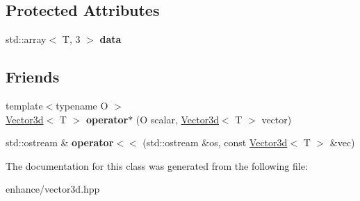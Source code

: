 \subsection*{Protected Attributes}
\begin{DoxyCompactItemize}
\item 
\mbox{\label{classenhance_1_1Vector3d_a6e216e575ab780dfae8a65a945ec286e}} 
std\+::array$<$ T, 3 $>$ {\bfseries data}
\end{DoxyCompactItemize}
\subsection*{Friends}
\begin{DoxyCompactItemize}
\item 
\mbox{\label{classenhance_1_1Vector3d_a6f5e8062a1500764d2b38787f1471b65}} 
{\footnotesize template$<$typename O $>$ }\\\mbox{\hyperlink{classenhance_1_1Vector3d}{Vector3d}}$<$ T $>$ {\bfseries operator$\ast$} (O scalar, \mbox{\hyperlink{classenhance_1_1Vector3d}{Vector3d}}$<$ T $>$ vector)
\item 
\mbox{\label{classenhance_1_1Vector3d_afbaa27f45fba698f24a7643be7df5dbf}} 
std\+::ostream \& {\bfseries operator$<$$<$} (std\+::ostream \&os, const \mbox{\hyperlink{classenhance_1_1Vector3d}{Vector3d}}$<$ T $>$ \&vec)
\end{DoxyCompactItemize}


The documentation for this class was generated from the following file\+:\begin{DoxyCompactItemize}
\item 
enhance/vector3d.\+hpp\end{DoxyCompactItemize}
